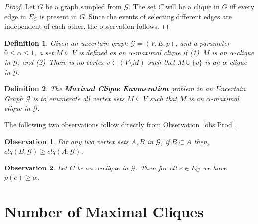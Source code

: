 \documentclass[11pt,letterpaper]{article}
\newtheorem{observation}{Observation}
\newtheorem{definition}{Definition}
\newcommand{\ugraph}{\mathcal{G}}
\newcommand{\cliqueprob}{clq}
\begin{document}
\begin{proof}
Let $G$ be a graph sampled from $\ugraph$. The set $C$ will be
a clique in $G$ iff every edge in $E_C$ is present in $G$. 
Since the events of selecting different edges are independent
of each other, the observation follows. 
\end{proof}

\begin{definition}
\label{def:MaxCliqueUncertainGraph2}
Given an uncertain graph $\ugraph=(V,E,p)$, and a parameter 
$0 \le \alpha \le 1$, a set $M \subseteq V$ is defined as an 
$\alpha$-maximal clique if 
(1)~$M$ is an $\alpha$-clique in $\ugraph$, and 
(2)~There is no vertex $v \in (V \setminus M)$ such that $M \cup \{v\}$ is an $\alpha$-clique in $\ugraph$.
\end{definition}

\begin{definition}
\label{def:MaxCliqueEnumProblem}
The {\bf Maximal Clique Enumeration} problem in an Uncertain Graph
$\ugraph$ is to enumerate all vertex sets $M \subseteq V$ such that
$M$ is an $\alpha$-maximal clique in $\ugraph$.
\end{definition}

The following two observations follow directly from Observation~\ref{obs:Prod}.
\begin{observation}
\label{obs:Sub}
For any two vertex sets $A,B$ in $\ugraph$, if $B \subset A$ then, 
$\cliqueprob(B,\ugraph) \ge \cliqueprob(A,\ugraph)$.
\end{observation}

\begin{observation}
\label{obs:Elim}
Let $C$ be an $\alpha$-clique in $\ugraph$. Then for all $e \in E_C$ 
we have $p(e) \geq \alpha$.
\end{observation}



\section{Number of Maximal Cliques}
\label{sec:number}
\end{document}
